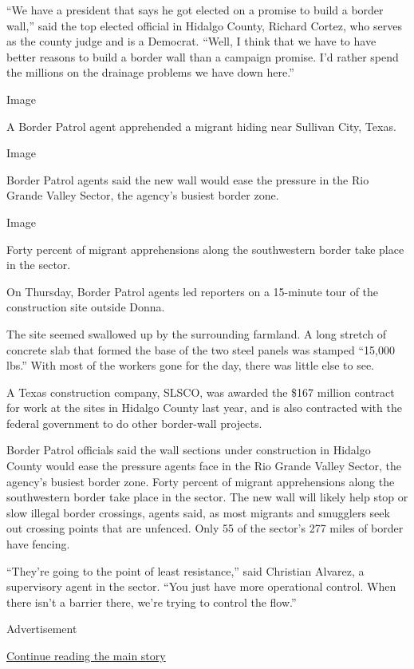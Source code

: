 ``We have a president that says he got elected on a promise to build a
border wall,'' said the top elected official in Hidalgo County, Richard
Cortez, who serves as the county judge and is a Democrat. ``Well, I
think that we have to have better reasons to build a border wall than a
campaign promise. I'd rather spend the millions on the drainage problems
we have down here.''

Image

A Border Patrol agent apprehended a migrant hiding near Sullivan City,
Texas.

Image

Border Patrol agents said the new wall would ease the pressure in the
Rio Grande Valley Sector, the agency's busiest border zone.

Image

Forty percent of migrant apprehensions along the southwestern border
take place in the sector.

On Thursday, Border Patrol agents led reporters on a 15-minute tour of
the construction site outside Donna.

The site seemed swallowed up by the surrounding farmland. A long stretch
of concrete slab that formed the base of the two steel panels was
stamped ``15,000 lbs.'' With most of the workers gone for the day, there
was little else to see.

A Texas construction company, SLSCO, was awarded the \$167 million
contract for work at the sites in Hidalgo County last year, and is also
contracted with the federal government to do other border-wall projects.

Border Patrol officials said the wall sections under construction in
Hidalgo County would ease the pressure agents face in the Rio Grande
Valley Sector, the agency's busiest border zone. Forty percent of
migrant apprehensions along the southwestern border take place in the
sector. The new wall will likely help stop or slow illegal border
crossings, agents said, as most migrants and smugglers seek out crossing
points that are unfenced. Only 55 of the sector's 277 miles of border
have fencing.

``They're going to the point of least resistance,'' said Christian
Alvarez, a supervisory agent in the sector. ``You just have more
operational control. When there isn't a barrier there, we're trying to
control the flow.''

Advertisement

\protect\hyperlink{after-bottom}{Continue reading the main story}

